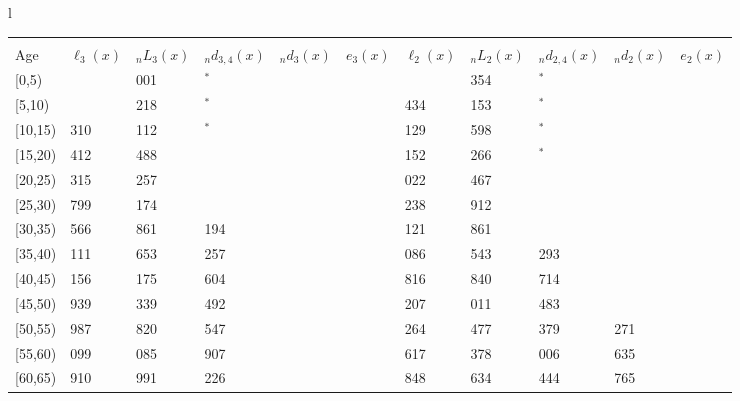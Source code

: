 \documentclass[
]{article}
\begin{document}
\begin{table}
\begin{tabular}[t]{l}
\end{tabular}
\centering
\begin{tabular}[t]{l}
\hline
\begin{tabular}{>{\raggedright\arraybackslash}p{.43in}>{\raggedleft\arraybackslash}p{.42in}>{\raggedleft\arraybackslash}p{.42in}>{\raggedleft\arraybackslash}p{.42in}>{\raggedleft\arraybackslash}p{.42in}>{\raggedleft\arraybackslash}p{.42in}>{\raggedleft\arraybackslash}p{.42in}>{\raggedleft\arraybackslash}p{.42in}>{\raggedleft\arraybackslash}p{.42in}>{\raggedleft\arraybackslash}p{.42in}>{\raggedleft\arraybackslash}p{.42in}}
\toprule
\multicolumn{1}{c}{ } & \multicolumn{5}{c}{(2) Lost mother only} & \multicolumn{5}{c}{(3) Lost father only} \\
\cmidrule(l{3pt}r{3pt}){2-6} \cmidrule(l{3pt}r{3pt}){7-11}
Age & $\ell_{3}(x)$ & ${}_nL_{3}(x)$ & ${}_nd_{3,4}(x)$ & ${}_nd_{3}(x)$ & $e_{3}(x)$ & $\ell_{2}(x)$ & ${}_nL_{2}(x)$ & ${}_nd_{2,4}(x)$ & ${}_nd_{2}(x)$ & $e_{2}(x)$\\
\midrule
{}[0,5) & 0 & 1 001 & 0$^{*}$ & 2 & 4 & 0 & 3 354 & 0$^{*}$ & 8 & 11\\
{}[5,10) & 438 & 4 218 & 16$^{*}$ & 1 & 4 & 1 434 & 11 153 & 73$^{*}$ & 2 & 11\\
{}[10,15) & 1 310 & 9 112 & 95$^{*}$ & 3 & 4 & 3 129 & 20 598 & 96$^{*}$ & 6 & 11\\
{}[15,20) & 2 412 & 14 488 & 307 & 17 & 3 & 5 152 & 33 266 & 179$^{*}$ & 39 & 11\\
{}[20,25) & 3 315 & 20 257 & 327 & 43 & 3 & 8 022 & 48 467 & 595 & 103 & 11\\
\addlinespace
{}[25,30) & 4 799 & 28 174 & 475 & 65 & 3 & 10 238 & 61 912 & 548 & 142 & 10\\
{}[30,35) & 5 566 & 30 861 & 1 194 & 88 & 3 & 13 121 & 82 861 & 812 & 235 & 10\\
{}[35,40) & 6 111 & 34 653 & 1 257 & 124 & 3 & 17 086 & 106 543 & 1 293 & 382 & 9\\
{}[40,45) & 7 156 & 40 175 & 1 604 & 187 & 2 & 21 816 & 125 840 & 2 714 & 587 & 8\\
{}[45,50) & 7 939 & 41 339 & 2 492 & 260 & 2 & 24 207 & 138 011 & 3 483 & 867 & 7\\
\addlinespace
{}[50,55) & 7 987 & 37 820 & 3 547 & 337 & 1 & 25 264 & 142 477 & 7 379 & 1 271 & 6\\
{}[55,60) & 6 099 & 32 085 & 2 907 & 429 & 1 & 22 617 & 122 378 & 7 006 & 1 635 & 4\\
{}[60,65) & 4 910 & 21 991 & 2 226 & 438 & 1 & 18 848 & 88 634 & 8 444 & 1 765 & 3\\

\end{tabular}
\end{tabular}
\end{table}
\end{document}
